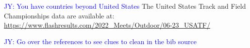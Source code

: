\documentclass[12pt, letterpaper, titlepage]{article}
\newcommand{\jy}[1]{\textcolor{blue}{JY: #1}}
\begin{document}
\jy{You have countries beyond United States}
The United States Track and Field Championships data are available at: 
\url{https://www.flashresults.com/2022_Meets/Outdoor/06-23_USATF/}



\jy{Go over the references to see clues to clean in the bib source}


\end{document}
